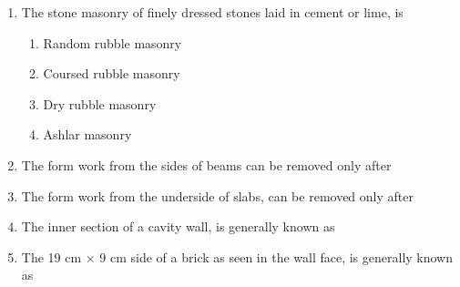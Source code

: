 \documentclass[11pt,a4paper]{article}
\begin{document}
\begin{enumerate}
\\
\item{The stone masonry of finely dressed stones laid in cement or lime, is}
\begin{enumerate}[label=\Alph*.]
\item{Random rubble masonry}
\item{Coursed rubble masonry}
\item{Dry rubble masonry}
\item{Ashlar masonry}
\end{enumerate}
\item{The form work from the sides of beams can be removed only after}
\\
\item{The form work from the underside of slabs, can be removed only after}
\\
\item{The inner section of a cavity wall, is generally known as}
\\
\item{The 19 cm $\times$ 9 cm side of a brick as seen in the wall face, is generally known as
}

\end{enumerate}
\end{document}
